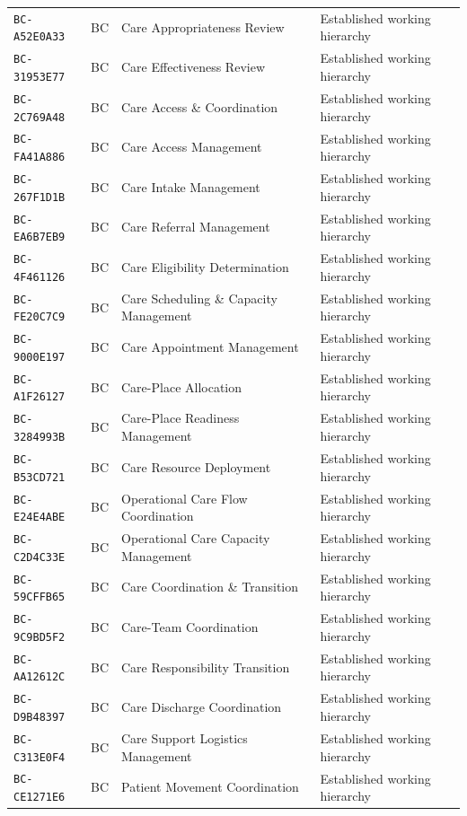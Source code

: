 \documentclass[11pt,a4paper,openany]{book}
\begin{document}
\begin{longtable}{@{}p{.19\linewidth}p{.12\linewidth}p{.39\linewidth}p{.24\linewidth}@{}}
\texttt{BC-A52E0A33} & BC & Care Appropriateness Review & Established working hierarchy \\
\texttt{BC-31953E77} & BC & Care Effectiveness Review & Established working hierarchy \\
\texttt{BC-2C769A48} & BC & Care Access \& Coordination & Established working hierarchy \\
\texttt{BC-FA41A886} & BC & Care Access Management & Established working hierarchy \\
\texttt{BC-267F1D1B} & BC & Care Intake Management & Established working hierarchy \\
\texttt{BC-EA6B7EB9} & BC & Care Referral Management & Established working hierarchy \\
\texttt{BC-4F461126} & BC & Care Eligibility Determination & Established working hierarchy \\
\texttt{BC-FE20C7C9} & BC & Care Scheduling \& Capacity Management & Established working hierarchy \\
\texttt{BC-9000E197} & BC & Care Appointment Management & Established working hierarchy \\
\texttt{BC-A1F26127} & BC & Care-Place Allocation & Established working hierarchy \\
\texttt{BC-3284993B} & BC & Care-Place Readiness Management & Established working hierarchy \\
\texttt{BC-B53CD721} & BC & Care Resource Deployment & Established working hierarchy \\
\texttt{BC-E24E4ABE} & BC & Operational Care Flow Coordination & Established working hierarchy \\
\texttt{BC-C2D4C33E} & BC & Operational Care Capacity Management & Established working hierarchy \\
\texttt{BC-59CFFB65} & BC & Care Coordination \& Transition & Established working hierarchy \\
\texttt{BC-9C9BD5F2} & BC & Care-Team Coordination & Established working hierarchy \\
\texttt{BC-AA12612C} & BC & Care Responsibility Transition & Established working hierarchy \\
\texttt{BC-D9B48397} & BC & Care Discharge Coordination & Established working hierarchy \\
\texttt{BC-C313E0F4} & BC & Care Support Logistics Management & Established working hierarchy \\
\texttt{BC-CE1271E6} & BC & Patient Movement Coordination & Established working hierarchy \\

\end{longtable}
\end{document}
